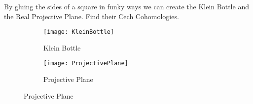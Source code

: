 \begin{ques}
  By gluing the sides of a square in funky ways we can create the Klein Bottle and the Real Projective Plane. Find their Cech Cohomologies.
  \begin{figure}[H]
  	\centering
  	\begin{subfigure}[t]{0.4\textwidth}
  		\centering
  		\texttt{[image: KleinBottle]}
      \caption{Klein Bottle}
  	\end{subfigure}
  	\begin{subfigure}[t]{0.59\textwidth}
  		\centering
  		\texttt{[image: ProjectivePlane]}
      \caption{Projective Plane}
  	\end{subfigure}
  \end{figure}
\end{ques}

